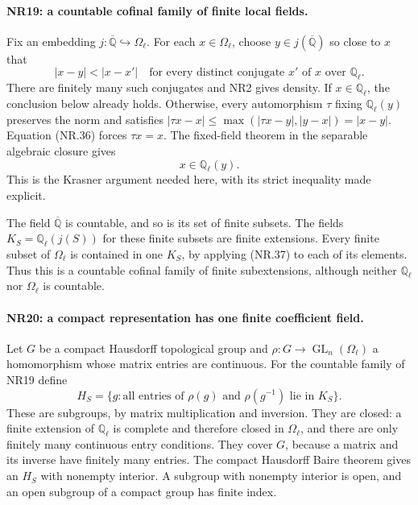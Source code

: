 \paragraph{NR19: a countable cofinal family of finite local fields.}
Fix an embedding $j:\overline{\mathbb Q}\hookrightarrow\Omega_\ell$.
For each $x\in\Omega_\ell$, choose $y\in j(\overline{\mathbb Q})$
so close to $x$ that
\[
 |x-y|<|x-x'|\quad\text{for every distinct conjugate }x'
                                  \text{ of }x\text{ over }\mathbb Q_\ell.
                                                               \tag{NR.36}
\]
There are finitely many such conjugates and NR2 gives density.
If $x\in\mathbb Q_\ell$, the conclusion below already holds.
Otherwise, every automorphism $\tau$ fixing $\mathbb Q_\ell(y)$
preserves the norm and satisfies
$|\tau x-x|\le\max(|\tau x-y|,|y-x|)=|x-y|$.
Equation (NR.36) forces $\tau x=x$. The fixed-field theorem in
the separable algebraic closure gives
\[
                              x\in\mathbb Q_\ell(y).  \tag{NR.37}
\]
This is the Krasner argument needed here, with its strict
inequality made explicit.

The field $\overline{\mathbb Q}$ is countable, and so is its set
of finite subsets. The fields
$K_S=\mathbb Q_\ell(j(S))$ for these finite subsets are finite
extensions. Every finite subset of $\Omega_\ell$ is contained
in one $K_S$, by applying (NR.37) to each of its elements.
Thus this is a countable cofinal family of finite subextensions,
although neither $\mathbb Q_\ell$ nor $\Omega_\ell$ is countable.

\paragraph{NR20: a compact representation has one finite coefficient field.}
Let $G$ be a compact Hausdorff topological group and
$\rho:G\to\operatorname{GL}_n(\Omega_\ell)$ a homomorphism whose
matrix entries are continuous. For the countable family of NR19
define
\[
 H_S=\{g:\text{all entries of }\rho(g)\text{ and }\rho(g^{-1})
                                                \text{ lie in }K_S\}.
                                                               \tag{NR.38}
\]
These are subgroups, by matrix multiplication and inversion.
They are closed: a finite extension of $\mathbb Q_\ell$ is
complete and therefore closed in $\Omega_\ell$, and there are
only finitely many continuous entry conditions. They cover
$G$, because a matrix and its inverse have finitely many entries.
The compact Hausdorff Baire theorem gives an $H_S$ with nonempty
interior. A subgroup with nonempty interior is open, and an open
subgroup of a compact group has finite index.

